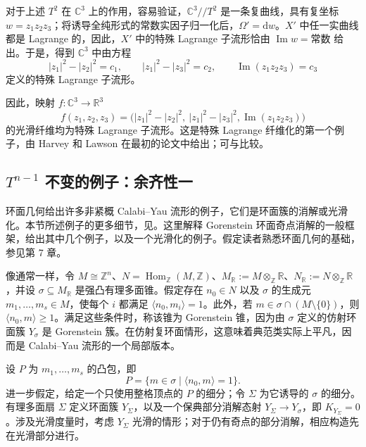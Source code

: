 \begin{example}\label{ex:7.7}
对于上述 $T^2$ 在 $\mathbb C^3$ 上的作用，容易验证，$\mathbb C^3/\!/T^2$ 是一条复曲线，具有复坐标 $w=z_1z_2z_3$；将诱导全纯形式的常数实因子归一化后，$\Omega'=\mathrm dw$。$X'$ 中任一实曲线都是 Lagrange 的，因此，$X'$ 中的特殊 Lagrange 子流形恰由 $\operatorname{Im}w=\text{常数}$ 给出。于是，得到 $\mathbb C^3$ 中由方程
\[
|z_1|^2-|z_2|^2=c_1,\qquad
|z_1|^2-|z_3|^2=c_2,\qquad
\operatorname{Im}(z_1z_2z_3)=c_3
\]
定义的特殊 Lagrange 子流形。

因此，映射 $f\colon\mathbb C^3\to\mathbb R^3$
\[
f(z_1,z_2,z_3)
=\bigl(|z_1|^2-|z_2|^2,\ |z_1|^2-|z_3|^2,
\operatorname{Im}(z_1z_2z_3)\bigr)
\]
的光滑纤维均为特殊 Lagrange 子流形。这是特殊 Lagrange 纤维化的第一个例子，由 Harvey 和 Lawson 在最初的论文中给出；可与比较。
\end{example}

\subsection{\texorpdfstring{$T^{n-1}$}{Tⁿ⁻¹} 不变的例子：余齐性一}\label{sec:7.2.3}

环面几何给出许多非紧概 Calabi--Yau 流形的例子，它们是环面簇的消解或光滑化。本节所述例子的更多细节，见。这里解释 Gorenstein 环面奇点消解的一般框架，给出其中几个例子，以及一个光滑化的例子。假定读者熟悉环面几何的基础，参见第 7 章。

像通常一样，令 $M\cong\mathbb Z^n$、$N=\operatorname{Hom}_{\mathbb Z}(M,\mathbb Z)$、$M_{\mathbb R}:=M\otimes_{\mathbb Z}\mathbb R$、$N_{\mathbb R}:=N\otimes_{\mathbb Z}\mathbb R$，并设 $\sigma\subseteq M_{\mathbb R}$ 是强凸有理多面锥。假定存在 $n_0\in N$ 以及 $\sigma$ 的生成元 $m_1,\ldots,m_s\in M$，使每个 $i$ 都满足 $\langle n_0,m_i\rangle=1$。此外，若 $m\in\sigma\cap(M\setminus\{0\})$，则 $\langle n_0,m\rangle\geq1$。满足这些条件时，称该锥为 Gorenstein 锥，因为由 $\sigma$ 定义的仿射环面簇 $Y_\sigma$ 是 Gorenstein 簇。在仿射复环面情形，这意味着典范类实际上平凡，因而是 Calabi--Yau 流形的一个局部版本。

设 $P$ 为 $m_1,\ldots,m_s$ 的凸包，即
\[
P=\{m\in\sigma\mid\langle n_0,m\rangle=1\}.
\]
进一步假定，给定一个只使用整格顶点的 $P$ 的细分；令 $\Sigma$ 为它诱导的 $\sigma$ 的细分。有理多面扇 $\Sigma$ 定义环面簇 $Y_\Sigma$，以及一个保典部分消解态射 $Y_\Sigma\to Y_\sigma$，即 $K_{Y_\Sigma}=0$。涉及光滑度量时，考虑 $Y_\Sigma$ 光滑的情形；对于仍有奇点的部分消解，相应构造先在光滑部分进行。

